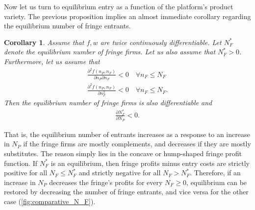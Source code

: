 \documentclass[a4paper]{article}
\newtheorem{corollary}{Corollary}
\begin{document}
Now let us turn to equilibrium entry as a function of the platform's product variety.
The previous proposition implies an almost immediate corollary regarding the equilibrium number of fringe entrants.
\begin{corollary}
    \label{cor:fringe_entry}
    Assume that $f, w$ are twice continuously differentiable.
    Let $N_F^*$ denote the equilibrium number of fringe firms.
    Let us also assume that $N_F^* > 0$.
    Furthermore, let us assume that
    \begin{align*}
        \frac{\partial^2 f(n_P, n_F)}{\partial n_P \partial n_F} < 0 \quad \forall n_F \leq N_F \\
        \frac{\partial^2 f(n_P, n_F)}{\partial n_F^2} < 0 \quad \forall n_F \leq N_F.
    \end{align*}
    Then the equilibrium number of fringe firms is also differentiable and
    \begin{align*}
        \frac{\partial N_F^*}{\partial N_P} < 0.
    \end{align*}
\end{corollary}
That is, the equilibrium number of entrants increases as a response to an increase in $N_P$ if the fringe firms are mostly complements, and decreases if they are mostly substitutes.
The reason simply lies in the concave or hump-shaped fringe profit function.
If $N_F^*$ is an equilibrium, then fringe profits minus entry costs are strictly positive for all $N_F \leq N_F^*$ and strictly negative for all $N_F > N_F^*$.
Therefore, if an increase in $N_P$ decreases the fringe's profits for every $N_F \geq 0$, equilibrium can be restored by decreasing the number of fringe entrants, and vice versa for the other case (\cref{fig:comparative_N_F}).
\end{document}
